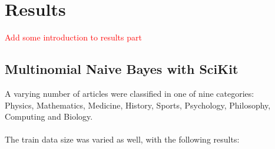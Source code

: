 \documentclass[a4paper]{article}
\begin{document}
\section{Results}

\textcolor{red}{Add some introduction to results part}

\subsection{Multinomial Naive Bayes with SciKit}

A varying number of articles were classified in one of nine categories: \\
Physics, Mathematics, Medicine, History, Sports, Psychology, Philosophy, Computing and Biology.\\
\\
The train data size was varied as well, with the following results:
\end{document}

